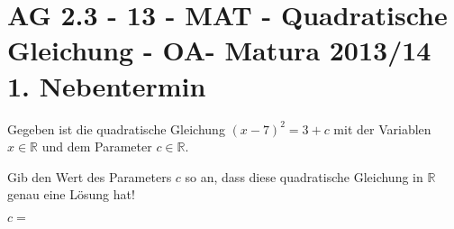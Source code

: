 \section{AG 2.3 - 13 - MAT - Quadratische Gleichung - OA- Matura 2013/14 1. Nebentermin}

\begin{beispiel}[AG 2.3]{1} %
				Gegeben ist die quadratische Gleichung $(x-7)^2=3+c$ mit der Variablen $x\in\mathbb{R}$ und dem Parameter $c\in\mathbb{R}$.
				
				Gib den Wert des Parameters $c$ so an, dass diese quadratische Gleichung in $\mathbb{R}$ genau eine Lösung hat!
				
				$c=$ 
\end{beispiel}